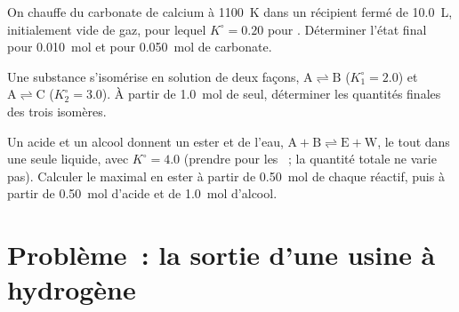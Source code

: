 \begin{exercise}[$\star\star\star$]\label{exo:b1:extent-q-and-k:10}
On chauffe du carbonate de calcium à \qty{1100}{K} dans un récipient
fermé de \qty{10.0}{L}, initialement vide de gaz, pour lequel
$K^\circ = 0.20$ pour . Déterminer
l'état final pour \qty{0.010}{mol} et pour \qty{0.050}{mol} de carbonate.
\end{exercise}

\begin{exercise}[$\star\star\star$]\label{exo:b1:extent-q-and-k:11}
Une substance  s'isomérise en solution de deux façons, $\mathrm{A \rightleftharpoons B}$
($K_1^\circ = 2.0$) et $\mathrm{A \rightleftharpoons C}$ ($K_2^\circ = 3.0$). À
partir de \qty{1.0}{mol} de  seul, déterminer les quantités
finales des trois isomères.
\end{exercise}

\begin{exercise}[$\star\star\star$]\label{exo:b1:extent-q-and-k:12}
Un acide  et un alcool  donnent un ester et de l'eau, $\mathrm{A + B
\rightleftharpoons E + W}$, le tout dans une seule  liquide, avec
$K^\circ = 4.0$ (prendre pour  les ~; la
quantité totale ne varie pas). Calculer le  maximal en ester à
partir de \qty{0.50}{mol} de chaque réactif, puis à partir de
\qty{0.50}{mol} d'acide et de \qty{1.0}{mol} d'alcool.
\end{exercise}

\section{Problème~: la sortie d'une usine à hydrogène}

